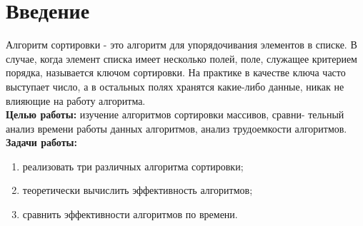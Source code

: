 \chapter*{Введение}


Алгоритм сортировки - это алгоритм для упорядочивания элементов
в списке. В случае, когда элемент списка имеет несколько полей, поле,
служащее критерием порядка, называется ключом сортировки. На практике
в качестве ключа часто выступает число, а в остальных полях хранятся
какие-либо данные, никак не влияющие на работу алгоритма.
\\


\textbf{Целью работы:} изучение алгоритмов сортировки массивов, сравни-
тельный анализ времени работы данных алгоритмов, анализ трудоемкости
алгоритмов.
\\

\textbf{Задачи работы:}

\begin{enumerate}
    \setlength{\itemsep}{0em}
    \item реализовать три различных алгоритма сортировки;
    \item теоретически вычислить эффективность алгоритмов;
    \item сравнить эффективности алгоритмов по времени.
\end{enumerate}
